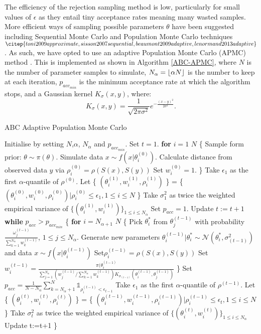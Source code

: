 \documentclass[twocolumn]{biophys}
\DeclarePairedDelimiter\floor{\lfloor}{\rfloor}
\begin{document}
The efficiency of the rejection sampling method is low, particularly for small values of $\epsilon$ as they entail tiny acceptance rates meaning many wasted samples. 
More efficient ways of sampling possible parameters $\theta$ have been suggested including Sequential Monte Carlo and Population Monte Carlo techniques $\citep{toni2009approximate, sisson2007sequential, beaumont2009adaptive, lenormand2013adaptive}$.
As such, we have opted to use an adaptive Population Monte Carlo (APMC) method  \citep{lenormand2013adaptive}. 
This is implemented as shown in Algorithm \ref{ABC-APMC}, where $N$ is the number of parameter samples to simulate, $N_{\alpha} = \floor{\alpha N}$ is the number to keep at each iteration, $p_{acc_{min}}$ is the minimum acceptance rate at which the algorithm stops, and a Gaussian kernel $K_{\sigma}(x,y)$, where:
$$K_{\sigma}(x,y) = \frac{1}{\sqrt{2\pi \sigma^2}} e^{-\frac{(x-y)^2}{2\sigma^2}}.$$
\begin{algorithm}
\caption{ABC Adaptive Population Monte Carlo}\label{ABC-APMC}
\begin{algorithmic}[1]
\State Initialise by setting $N$,$\alpha$, $N_{\alpha}$ and $p_{acc_{min}}$.
\State Set $t=1$.
\State \textbf{for} $i=1$  $N$  \{
\State Sample form prior: $\theta \sim \pi (\theta)$. 
\State Simulate data $x \sim f \left(x|\theta_i^{(0)} \right)$.
\State Calculate distance from observed data $y$ via $\rho_i^{(0)} = \rho(S(x),S(y))$
\State Set $w_i^{(0)} = 1$.
\State \}
\State Take $\epsilon_1$ as the first $\alpha$-quantile of $\rho^{(0)}$.
\State Let \{ $(\theta_i^{(1)},w_i^{(1)}, \rho_i^{(1)})$ \} = \{ $(\theta_i^{(0)},w_i^{(0)}, \rho_i^{(0)}) | \rho_i^{(0)} \le \epsilon_1, 1 \le i \le N$ \} 
\State Take $\sigma_1^2$ as twice the weighted empirical variance of $\{(\theta_i^{(1)} ,w_i^{(1)}) \} _{1\le i \le N_{\alpha}}$
\State Set $p_{acc} = 1$.
\State Update $t:=t+1$
\State \textbf{while} $p_{acc}>p_{acc_{min}}$ \{ 
\State \textbf{for} $i=N_{\alpha+1}$  $N$ \{
\State Pick $\theta_i^{*}$ from $\theta_j^{(t-1)}$ with probability $\frac{\omega_j^{(t-1)}}{\sum_{k=1}^{N_{\alpha}} w_k^{(t-1)}  }$, $1 \le j \le N_{\alpha}$.  
\State Generate new parameters $\theta_i^{(t-1)}|\theta_i^{*} \sim \mathcal{N} \left(\theta_i^{*}, \sigma_{(t-1)}^2 \right)$ and data $x \sim f \left(x|\theta_i^{(t-1)} \right)$
\State Set$ \rho_i^{(t-1)} = \rho (S(x),S(y))$
\State Set $w_i^{(t-1)} = \frac{\pi(\theta_i^{(t-1)}}{\sum_{j=1}^{N_{\alpha}}(w_j^{(t-1)}/\sum_{k=1}^{N_{\alpha}} w_k^{(t-1)}) K_{\sigma_{(t-1)}}\left(\theta_i^{(t-1)},\theta_j^{(t-1)} \right) }$
\State \}
\State Set $p_{acc} = \frac{1}{N-N_{\alpha}} \sum_{k=N_{\alpha}+1}^N \mathds{1}_{\rho_i^{(t-1)} < \epsilon_{t-1}}$
\State Take $\epsilon_1$ as the first $\alpha$-quantile of $\rho^{(t-1)}$.
\State Let \{ $(\theta_i^{(t)},w_i^{(t)}, \rho_i^{(t)})$ \} = \{ $(\theta_i^{(t-1)},w_i^{(t-1)}, \rho_i^{(t-1)}) | \rho_i^{(t-1)} \le \epsilon_t, 1 \le i \le N$ \} 
\State Take $\sigma_t^2$ as twice the weighted empirical variance of $\{(\theta_i^{(t)} ,w_i^(t)) \} _{1\le i \le N_{\alpha}}$
\State Update t:=t+1
\State \}
\end{algorithmic}
\end{algorithm}
\end{document}

